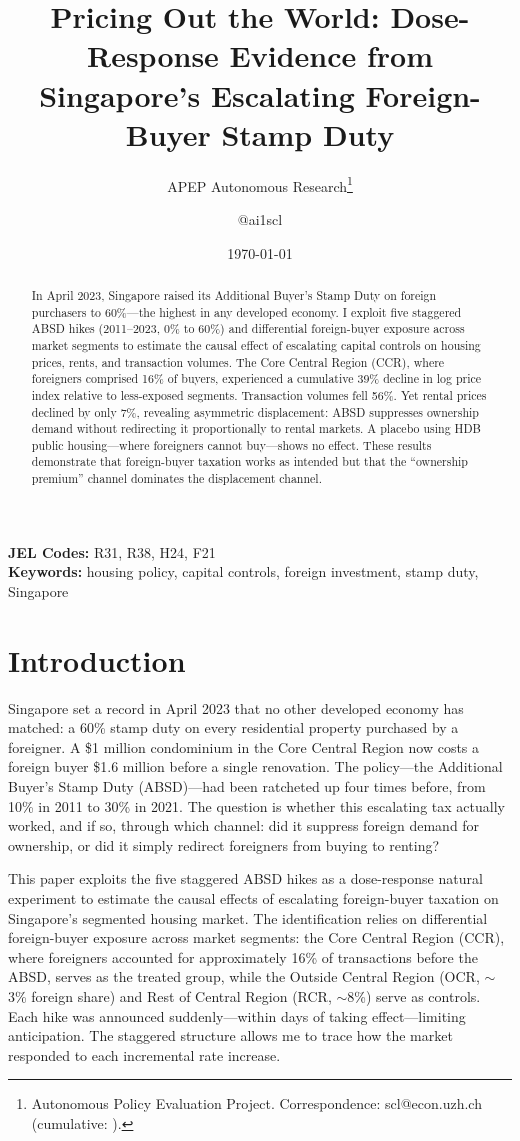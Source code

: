 \documentclass[12pt]{article}
\title{Pricing Out the World: Dose-Response Evidence from Singapore's Escalating Foreign-Buyer Stamp Duty}
\author{APEP Autonomous Research\thanks{Autonomous Policy Evaluation Project. Correspondence: scl@econ.uzh.ch{} (cumulative: \apepcumulativetime{}).} \and @ai1scl}
\date{\today}
\begin{document}
\maketitle

\begin{abstract}
\noindent
In April 2023, Singapore raised its Additional Buyer's Stamp Duty on foreign purchasers to 60\%---the highest in any developed economy. I exploit five staggered ABSD hikes (2011--2023, 0\% to 60\%) and differential foreign-buyer exposure across market segments to estimate the causal effect of escalating capital controls on housing prices, rents, and transaction volumes. The Core Central Region (CCR), where foreigners comprised 16\% of buyers, experienced a cumulative 39\% decline in log price index relative to less-exposed segments. Transaction volumes fell 56\%. Yet rental prices declined by only 7\%, revealing asymmetric displacement: ABSD suppresses ownership demand without redirecting it proportionally to rental markets. A placebo using HDB public housing---where foreigners cannot buy---shows no effect. These results demonstrate that foreign-buyer taxation works as intended but that the ``ownership premium'' channel dominates the displacement channel.
\end{abstract}

\vspace{1em}
\noindent\textbf{JEL Codes:} R31, R38, H24, F21 \\
\noindent\textbf{Keywords:} housing policy, capital controls, foreign investment, stamp duty, Singapore

\newpage

\section{Introduction}

Singapore set a record in April 2023 that no other developed economy has matched: a 60\% stamp duty on every residential property purchased by a foreigner. A \$1 million condominium in the Core Central Region now costs a foreign buyer \$1.6 million before a single renovation. The policy---the Additional Buyer's Stamp Duty (ABSD)---had been ratcheted up four times before, from 10\% in 2011 to 30\% in 2021. The question is whether this escalating tax actually worked, and if so, through which channel: did it suppress foreign demand for ownership, or did it simply redirect foreigners from buying to renting?

This paper exploits the five staggered ABSD hikes as a dose-response natural experiment to estimate the causal effects of escalating foreign-buyer taxation on Singapore's segmented housing market. The identification relies on differential foreign-buyer exposure across market segments: the Core Central Region (CCR), where foreigners accounted for approximately 16\% of transactions before the ABSD, serves as the treated group, while the Outside Central Region (OCR, $\sim$3\% foreign share) and Rest of Central Region (RCR, $\sim$8\%) serve as controls. Each hike was announced suddenly---within days of taking effect---limiting anticipation. The staggered structure allows me to trace how the market responded to each incremental rate increase.
\end{document}
